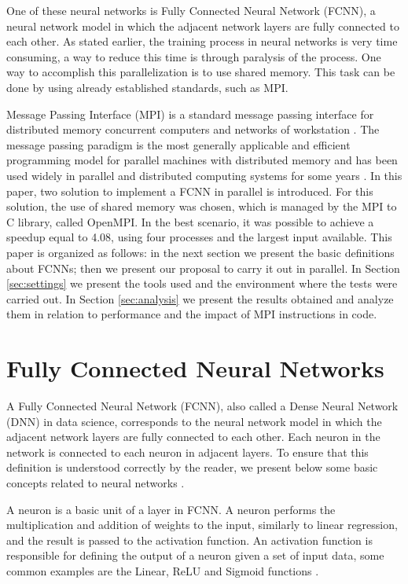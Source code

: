 \documentclass[conference]{IEEEtran}
\begin{document}
One of these neural networks is Fully Connected Neural Network (FCNN), a neural network model in which the adjacent network layers are fully connected to each other. As stated earlier, the training process in neural networks is very time consuming, a way to reduce this time is through paralysis of the process. One way to accomplish this parallelization is to use shared memory. This task can be done by using already established standards, such as MPI.

Message Passing Interface (MPI) is a standard message passing interface for distributed memory concurrent computers and networks of workstation \cite{the1993mpi}. The message passing paradigm is the most generally applicable and efficient programming model for parallel machines with distributed memory and has been used widely in parallel and distributed computing systems for some years \cite{clarke1994mpi}.
In this paper, two solution to implement a FCNN in parallel is introduced. For this solution, the use of shared memory was chosen, which is managed by the MPI to C library, called OpenMPI. In the best scenario, it was possible to achieve a speedup equal to 4.08, using four processes and the largest input available.
This paper is organized as follows: in the next section we present the basic definitions about FCNNs; then we present our proposal to carry it out in parallel. In Section \ref{sec:settings} we present the tools used and the environment where the tests were carried out. In Section \ref{sec:analysis} we present the results obtained and analyze them in relation to performance and the impact of MPI instructions in code.

\section{Fully Connected Neural Networks}\label{sec:fcnn}

A Fully Connected Neural Network (FCNN), also called a Dense Neural Network (DNN) in data science, corresponds to the neural network model in which the adjacent network layers are fully connected to each other. Each neuron in the network is connected to each neuron in adjacent layers. To ensure that this definition is understood correctly by the reader, we present below some basic concepts related to neural networks \cite{kononenko2007machine}.

A neuron is a basic unit of a layer in FCNN. A neuron performs the multiplication and addition of weights to the input, similarly to linear regression, and the result is passed to the activation function. An activation function is responsible for defining the output of a neuron given a set of input data, some common examples are the Linear, ReLU and Sigmoid functions \cite{kononenko2007machine,alom2019state}.
\end{document}
